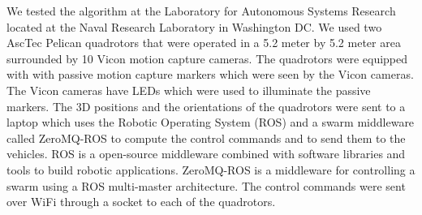 \documentclass{article}
\begin{document}
We tested the algorithm at the Laboratory for Autonomous Systems Research
located at the Naval Research Laboratory in Washington DC\@. We used two AscTec
Pelican quadrotors that were operated in a 5.2 meter by 5.2 meter area
surrounded by 10 Vicon motion capture cameras. The quadrotors were equipped
with with passive motion capture markers which were seen by the Vicon cameras.
The Vicon cameras have LEDs which were used to illuminate the passive markers.
The 3D positions and the orientations of the quadrotors were sent to a laptop
which uses the Robotic Operating System (ROS) and a swarm middleware called
ZeroMQ-ROS to compute the control commands and to send them to the vehicles.
ROS is a open-source middleware combined with software libraries and tools to
build robotic applications. ZeroMQ-ROS is a middleware for controlling a swarm
using a ROS multi-master architecture. The control commands were sent over WiFi
through a socket to each of the quadrotors.

 
\end{document}
